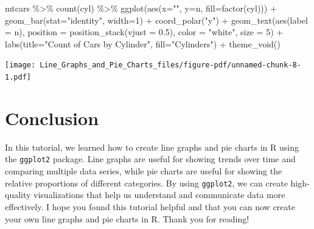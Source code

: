 \documentclass[
  letterpaper,
  DIV=11,
  numbers=noendperiod]{scrreprt}
\newenvironment{Shaded}{\begin{snugshade}}{\end{snugshade}}
\newcommand{\AttributeTok}[1]{\textcolor[rgb]{0.40,0.45,0.13}{#1}}
\newcommand{\DecValTok}[1]{\textcolor[rgb]{0.68,0.00,0.00}{#1}}
\newcommand{\FloatTok}[1]{\textcolor[rgb]{0.68,0.00,0.00}{#1}}
\newcommand{\FunctionTok}[1]{\textcolor[rgb]{0.28,0.35,0.67}{#1}}
\newcommand{\NormalTok}[1]{\textcolor[rgb]{0.00,0.23,0.31}{#1}}
\newcommand{\SpecialCharTok}[1]{\textcolor[rgb]{0.37,0.37,0.37}{#1}}
\newcommand{\StringTok}[1]{\textcolor[rgb]{0.13,0.47,0.30}{#1}}
\begin{document}
\begin{Shaded}
\begin{Highlighting}[]
\NormalTok{mtcars }\SpecialCharTok{\%\textgreater{}\%}
  \FunctionTok{count}\NormalTok{(cyl) }\SpecialCharTok{\%\textgreater{}\%}
  \FunctionTok{ggplot}\NormalTok{(}\FunctionTok{aes}\NormalTok{(}\AttributeTok{x=}\StringTok{""}\NormalTok{, }\AttributeTok{y=}\NormalTok{n, }\AttributeTok{fill=}\FunctionTok{factor}\NormalTok{(cyl))) }\SpecialCharTok{+}
  \FunctionTok{geom\_bar}\NormalTok{(}\AttributeTok{stat=}\StringTok{"identity"}\NormalTok{, }\AttributeTok{width=}\DecValTok{1}\NormalTok{) }\SpecialCharTok{+}
  \FunctionTok{coord\_polar}\NormalTok{(}\StringTok{"y"}\NormalTok{) }\SpecialCharTok{+}
  \FunctionTok{geom\_text}\NormalTok{(}\FunctionTok{aes}\NormalTok{(}\AttributeTok{label =}\NormalTok{ n),}
        \AttributeTok{position =} \FunctionTok{position\_stack}\NormalTok{(}\AttributeTok{vjust =} \FloatTok{0.5}\NormalTok{),}
        \AttributeTok{color =} \StringTok{"white"}\NormalTok{, }\AttributeTok{size =} \DecValTok{5}\NormalTok{) }\SpecialCharTok{+}
  \FunctionTok{labs}\NormalTok{(}\AttributeTok{title=}\StringTok{"Count of Cars by Cylinder"}\NormalTok{,}
       \AttributeTok{fill=}\StringTok{"Cylinders"}\NormalTok{) }\SpecialCharTok{+}
  \FunctionTok{theme\_void}\NormalTok{()}
\end{Highlighting}
\end{Shaded}

\texttt{[image: Line\_Graphs\_and\_Pie\_Charts\_files/figure-pdf/unnamed-chunk-8-1.pdf]}

\section*{Conclusion}\label{conclusion-1}


In this tutorial, we learned how to create line graphs and pie charts in
R using the \texttt{ggplot2} package. Line graphs are useful for showing
trends over time and comparing multiple data series, while pie charts
are useful for showing the relative proportions of different categories.
By using \texttt{ggplot2}, we can create high-quality visualizations
that help us understand and communicate data more effectively. I hope
you found this tutorial helpful and that you can now create your own
line graphs and pie charts in R. Thank you for reading!

\end{document}
